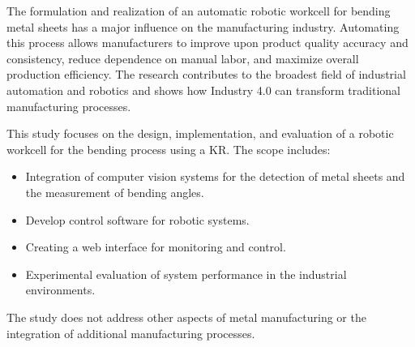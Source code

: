 The formulation and realization of an automatic robotic workcell for bending metal sheets has a major influence on the manufacturing industry. Automating this process allows manufacturers to improve upon product quality accuracy and consistency, reduce dependence on manual labor, and maximize overall production efficiency. The research contributes to the broadest field of industrial automation and robotics and shows how Industry 4.0 can transform traditional manufacturing processes.

This study focuses on the design, implementation, and evaluation of a robotic workcell for the bending process using a KR. The scope includes:
\begin{itemize}
    \item Integration of computer vision systems for the detection of metal sheets and the measurement of bending angles.
    \item Develop control software for robotic systems. 
    \item Creating a web interface for monitoring and control.
    \item Experimental evaluation of system performance in the industrial environments. 
\end{itemize}

The study does not address other aspects of metal manufacturing or the integration of additional manufacturing processes.